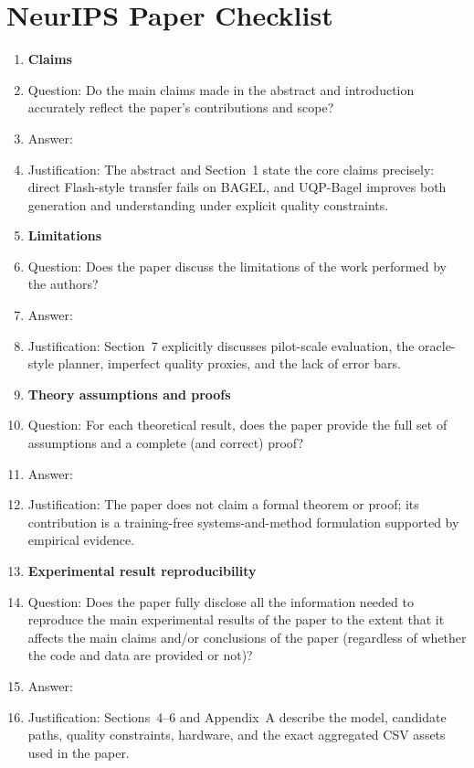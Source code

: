 ﻿\section*{NeurIPS Paper Checklist}

\begin{enumerate}[leftmargin=*]
\item \textbf{Claims}
\item[] Question: Do the main claims made in the abstract and introduction accurately reflect the paper's contributions and scope?
\item[] Answer: \answerYes{}
\item[] Justification: The abstract and Section~1 state the core claims precisely: direct Flash-style transfer fails on BAGEL, and UQP-Bagel improves both generation and understanding under explicit quality constraints.

\item \textbf{Limitations}
\item[] Question: Does the paper discuss the limitations of the work performed by the authors?
\item[] Answer: \answerYes{}
\item[] Justification: Section~7 explicitly discusses pilot-scale evaluation, the oracle-style planner, imperfect quality proxies, and the lack of error bars.

\item \textbf{Theory assumptions and proofs}
\item[] Question: For each theoretical result, does the paper provide the full set of assumptions and a complete (and correct) proof?
\item[] Answer: \answerNA{}
\item[] Justification: The paper does not claim a formal theorem or proof; its contribution is a training-free systems-and-method formulation supported by empirical evidence.

\item \textbf{Experimental result reproducibility}
\item[] Question: Does the paper fully disclose all the information needed to reproduce the main experimental results of the paper to the extent that it affects the main claims and/or conclusions of the paper (regardless of whether the code and data are provided or not)?
\item[] Answer: \answerYes{}
\item[] Justification: Sections~4--6 and Appendix~A describe the model, candidate paths, quality constraints, hardware, and the exact aggregated CSV assets used in the paper.


\end{enumerate}
